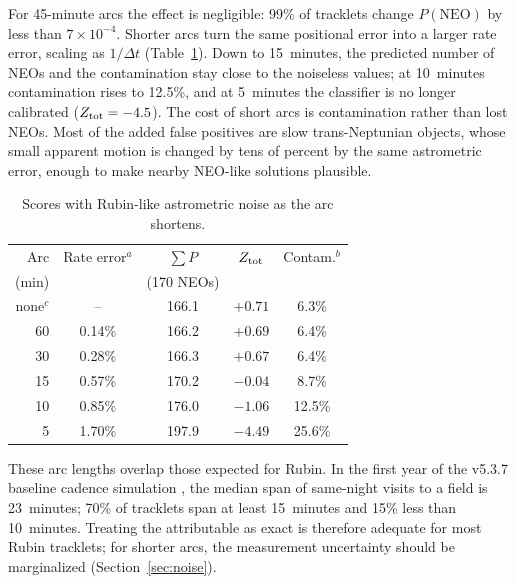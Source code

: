 \documentclass[linenumbers,twocolumn]{aastex701}
\begin{document}
For 45-minute arcs the effect is negligible: 99\% of tracklets change
$P(\mathrm{NEO})$ by less than $7\times10^{-4}$. Shorter arcs turn the same
positional error into a larger rate error, scaling as $1/\Delta t$
(Table~\ref{tab:arclength}). Down to 15~minutes, the predicted number of
NEOs and the contamination stay close to the noiseless values; at
10~minutes contamination rises to 12.5\%, and at 5~minutes the classifier
is no longer calibrated ($Z_{\rm tot}=-4.5$). The cost of short arcs is
contamination rather than lost NEOs. Most of the added false positives are
slow trans-Neptunian objects, whose small apparent motion is changed by
tens of percent by the same astrometric error, enough to make nearby
NEO-like solutions plausible.

\begin{table}
\centering
\caption{Scores with Rubin-like astrometric noise as the arc shortens.}
\label{tab:arclength}
\begin{tabular}{rcccc}
\hline
Arc & Rate error$^a$ & $\sum P$ & $Z_{\rm tot}$ & Contam.$^b$ \\
(min) & & (170 NEOs) & & \\
\hline
none$^c$ & --        & 166.1 & $+0.71$ & 6.3\% \\
60       & 0.14\%    & 166.2 & $+0.69$ & 6.4\% \\
30       & 0.28\%    & 166.3 & $+0.67$ & 6.4\% \\
15       & 0.57\%    & 170.2 & $-0.04$ & 8.7\% \\
10       & 0.85\%    & 176.0 & $-1.06$ & 12.5\% \\
5        & 1.70\%    & 197.9 & $-4.49$ & 25.6\% \\
\hline
\end{tabular}
\end{table}

These arc lengths overlap those expected for Rubin. In the first year of
the v5.3.7 baseline cadence simulation \citep{bianco2022,PSTN-056}, the
median span of same-night visits to a field is 23~minutes; 70\% of
tracklets span at least 15~minutes and 15\% less than 10~minutes. Treating
the attributable as exact is therefore adequate for most Rubin tracklets;
for shorter arcs, the measurement uncertainty should be marginalized
(Section~\ref{sec:noise}).
\end{document}
